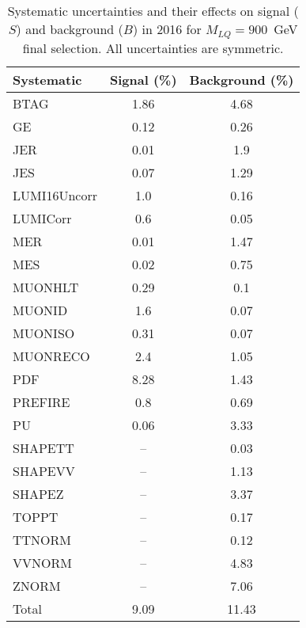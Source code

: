 \begin{table}[htbp]
\begin{center}
\caption{Systematic uncertainties and their effects on signal ($S$) and background ($B$) in 2016 for $M_{LQ}=900$~GeV final selection. All uncertainties are symmetric.}
\begin{tabular}{lcc}
\hline\hline
Systematic & Signal (\%) & Background (\%) \\ \hline 
BTAG & 1.86 & 4.68\\ 
GE & 0.12 & 0.26\\ 
JER & 0.01 & 1.9\\ 
JES & 0.07 & 1.29\\ 
LUMI16Uncorr & 1.0 & 0.16\\ 
LUMICorr & 0.6 & 0.05\\ 
MER & 0.01 & 1.47\\ 
MES & 0.02 & 0.75\\ 
MUONHLT & 0.29 & 0.1\\ 
MUONID & 1.6 & 0.07\\ 
MUONISO & 0.31 & 0.07\\ 
MUONRECO & 2.4 & 1.05\\ 
PDF & 8.28 & 1.43\\ 
PREFIRE & 0.8 & 0.69\\ 
PU & 0.06 & 3.33\\ 
SHAPETT & -- & 0.03\\ 
SHAPEVV & -- & 1.13\\ 
SHAPEZ & -- & 3.37\\ 
TOPPT & -- & 0.17\\ 
TTNORM & -- & 0.12\\ 
VVNORM & -- & 4.83\\ 
ZNORM & -- & 7.06\\ 
Total & 9.09 & 11.43\\ \hline \hline
\end{tabular}
\label{tab:SysUncertainties_uujj_900}
\end{center}
\end{table}

